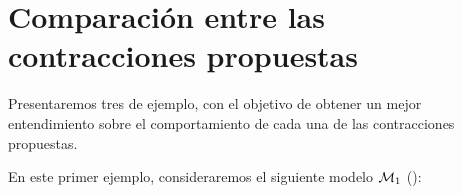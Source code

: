 





\section{Comparación entre las contracciones propuestas}

Presentaremos tres \ultss de ejemplo, con el objetivo de obtener un mejor entendimiento sobre el comportamiento de cada una de las 
contracciones propuestas.

En este primer ejemplo, consideraremos el siguiente modelo $\mathcal{M}_1$ ():

